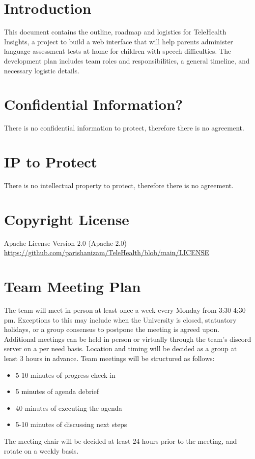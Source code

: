 \documentclass{article}
\begin{document}
\section*{Introduction}

This document contains the outline, roadmap and logistics for TeleHealth Insights, a project to build a web 
interface that will help parents administer language assessment tests at home for children with speech
difficulties. The development plan includes team roles and responsibilities, a general timeline, and 
necessary logistic details.

\section{Confidential Information?}

There is no confidential information to protect, therefore there is no agreement.

\section{IP to Protect}

There is no intellectual property to protect, therefore there is no agreement.

\section{Copyright License}

Apache License Version 2.0 (Apache-2.0) \\
\url{https://github.com/parishanizam/TeleHealth/blob/main/LICENSE}

\section{Team Meeting Plan}

The team will meet in-person at least once a week every Monday from 3:30-4:30 pm. Exceptions to this 
may include when the University is closed, statuatory holidays, or a group consensus to postpone the meeting
is agreed upon. Additional meetings can be held in person or virtually through the team's discord server on 
a per need basis. Location and timing will be decided as a group at least 3 hours in advance. Team meetings will
be structured as follows:
\begin{itemize}
  \item 5-10 minutes of progress check-in 
  \item 5 minutes of agenda debrief
  \item 40 minutes of executing the agenda
  \item 5-10 minutes of discussing next steps
\end{itemize}
\indent The meeting chair will be decided at least 24 hours prior to the meeting, and rotate on a weekly basis.
\end{document}
